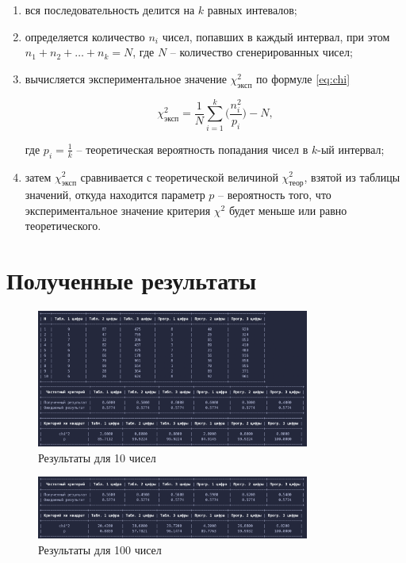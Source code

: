 \begin{enumerate}
    \item вся последовательность делится на $k$ равных интевалов;
    \item определяется количество $n_i$ чисел, попавших в каждый интервал, при этом $n_1 + n_2 + \ldots + n_k = N$, где $N$ -- количество сгенерированных чисел;
    \item вычисляется экспериментальное значение $\chi^2_\text{эксп}$ по формуле \ref{eq:chi}

        \begin{equation}\label{eq:chi}
            \chi^2_\text{эксп} = \frac{1}{N} \sum_{i=1}^k \bigg( \frac{n_i^2}{p_i} \bigg) - N,
        \end{equation}

        где $p_i = \frac{1}{k}$ -- теоретическая вероятность попадания чисел в $k$-ый интервал;

    \item затем $\chi^2_\text{эксп}$ сравнивается с теоретической величиной $\chi^2_\text{теор}$, взятой из таблицы значений, откуда находится параметр $p$ -- вероятность того, что экспериментальное значение критерия $\chi^2$ будет меньше или равно теоретического.
\end{enumerate}

\section{Полученные результаты}

\begin{figure}[H]
    \centering
    \includegraphics[width=0.8\textwidth]{img/content/10.png}
    \caption{Результаты для 10 чисел}
    \label{fig:}
\end{figure}

\begin{figure}[H]
    \centering
    \includegraphics[width=0.8\textwidth]{img/content/100.png}
    \caption{Результаты для 100 чисел}
    \label{fig:}
\end{figure}

